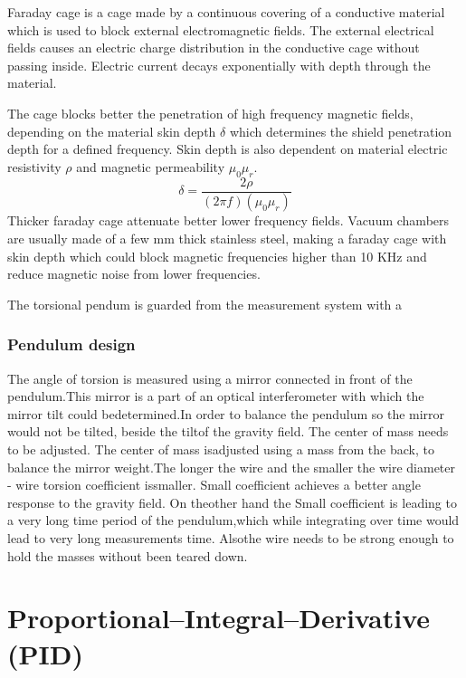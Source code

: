 \documentclass[\main/master.tex]{subfiles}
\begin{document}
Faraday cage is a cage made by a continuous covering of a conductive material which is used to block external electromagnetic fields. The external electrical fields causes an electric charge distribution in the conductive cage without passing inside. Electric current decays exponentially with depth through the material.

\par\noindent
The cage blocks better the penetration of high frequency magnetic fields, depending on the material skin depth $\delta$ which determines the shield penetration depth for a defined frequency. Skin depth is also dependent on material electric resistivity $\rho$ and magnetic permeability $\mu_0\mu_r$. 
\begin{equation}
\delta = \frac{2\rho}{(2\pi f)(\mu_0\mu_r)}     \label{eqn:mean-free-pass}
\end{equation}
Thicker faraday cage attenuate better lower frequency fields. Vacuum chambers are usually made of a few mm thick stainless steel, making a faraday cage with skin depth which could block magnetic frequencies higher than 10 KHz and reduce magnetic noise from lower frequencies.
\par\noindent
The torsional pendum is guarded from the measurement system with a 


\subsubsection{Pendulum design}

\par\noindent
The angle of torsion is measured using a mirror connected in front of the pendulum.This mirror is a part of an optical interferometer with which the mirror tilt could bedetermined.In order to balance the pendulum so the mirror would not be tilted, beside the tiltof the gravity field. The center of mass needs to be adjusted. The center of mass isadjusted using a mass from the back, to balance the mirror weight.The longer the wire and the smaller the wire diameter - wire torsion coefficient issmaller. Small coefficient achieves a better angle response to the gravity field. On theother hand the Small coefficient is leading to a very long time period of the pendulum,which while integrating over time would lead to very long measurements time. Alsothe wire needs to be strong enough to hold the masses without been teared down.



\section{Proportional–Integral–Derivative (PID)}
\end{document}
